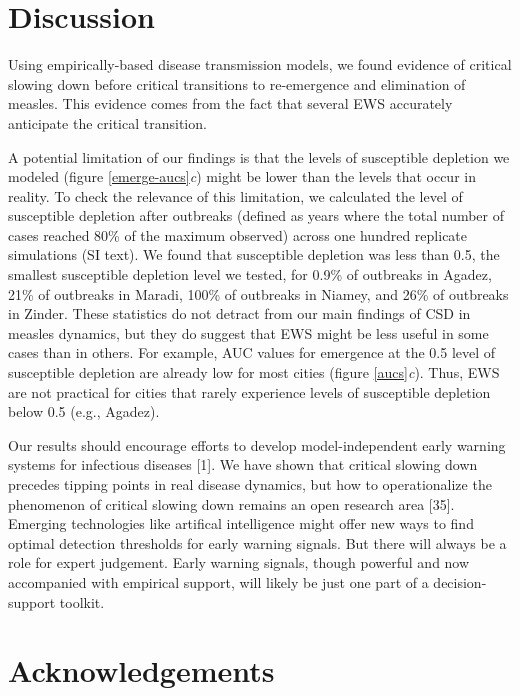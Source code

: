 \documentclass[3p]{elsarticle} %
\begin{document}
\hypertarget{discussion}{%
\section{Discussion}\label{discussion}}

Using empirically-based disease transmission models, we found evidence
of critical slowing down before critical transitions to re-emergence and
elimination of measles. This evidence comes from the fact that several
EWS accurately anticipate the critical transition.

A potential limitation of our findings is that the levels of susceptible
depletion we modeled (figure \ref{emerge-aucs}\emph{c}) might be lower
than the levels that occur in reality. To check the relevance of this
limitation, we calculated the level of susceptible depletion after
outbreaks (defined as years where the total number of cases reached 80\%
of the maximum observed) across one hundred replicate simulations (SI
text). We found that susceptible depletion was less than 0.5, the
smallest susceptible depletion level we tested, for 0.9\% of outbreaks
in Agadez, 21\% of outbreaks in Maradi, 100\% of outbreaks in Niamey,
and 26\% of outbreaks in Zinder. These statistics do not detract from
our main findings of CSD in measles dynamics, but they do suggest that
EWS might be less useful in some cases than in others. For example, AUC
values for emergence at the 0.5 level of susceptible depletion are
already low for most cities (figure \ref{aucs}\emph{c}). Thus, EWS are
not practical for cities that rarely experience levels of susceptible
depletion below 0.5 (e.g., Agadez).

Our results should encourage efforts to develop model-independent early
warning systems for infectious diseases {[}1{]}. We have shown that
critical slowing down precedes tipping points in real disease dynamics,
but how to operationalize the phenomenon of critical slowing down
remains an open research area {[}35{]}. Emerging technologies like
artifical intelligence might offer new ways to find optimal detection
thresholds for early warning signals. But there will always be a role
for expert judgement. Early warning signals, though powerful and now
accompanied with empirical support, will likely be just one part of a
decision-support toolkit.

\hypertarget{acknowledgements}{%
\section{Acknowledgements}\label{acknowledgements}}
\end{document}
